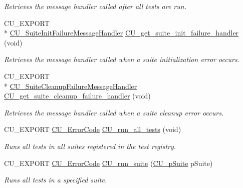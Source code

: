 \begin{DoxyCompactItemize}
\begin{DoxyCompactList}\small\item\em Retrieves the message handler called after all tests are run. \end{DoxyCompactList}\item 
C\-U\-\_\-\-E\-X\-P\-O\-R\-T \\*
\hyperlink{group__Framework_ga53faf49a6045a1fc32c5a0287b800b65}{C\-U\-\_\-\-Suite\-Init\-Failure\-Message\-Handler} \hyperlink{group__Framework_ga9b9f86b2d875553995daf07baea7db3b}{C\-U\-\_\-get\-\_\-suite\-\_\-init\-\_\-failure\-\_\-handler} (void)
\begin{DoxyCompactList}\small\item\em Retrieves the message handler called when a suite initialization error occurs. \end{DoxyCompactList}\item 
C\-U\-\_\-\-E\-X\-P\-O\-R\-T \\*
\hyperlink{group__Framework_ga67a720062975e6b7f97df16a1e8e10ce}{C\-U\-\_\-\-Suite\-Cleanup\-Failure\-Message\-Handler} \hyperlink{group__Framework_ga9d180e4db3591109077c81c6ab4cb151}{C\-U\-\_\-get\-\_\-suite\-\_\-cleanup\-\_\-failure\-\_\-handler} (void)
\begin{DoxyCompactList}\small\item\em Retrieves the message handler called when a suite cleanup error occurs. \end{DoxyCompactList}\item 
C\-U\-\_\-\-E\-X\-P\-O\-R\-T \hyperlink{group__Framework_ga743a2a025ee3eb792d7d85f0eea347e6}{C\-U\-\_\-\-Error\-Code} \hyperlink{group__Framework_gada41915e7f9ae386ecc1bed20a79300b}{C\-U\-\_\-run\-\_\-all\-\_\-tests} (void)
\begin{DoxyCompactList}\small\item\em Runs all tests in all suites registered in the test registry. \end{DoxyCompactList}\item 
C\-U\-\_\-\-E\-X\-P\-O\-R\-T \hyperlink{group__Framework_ga743a2a025ee3eb792d7d85f0eea347e6}{C\-U\-\_\-\-Error\-Code} \hyperlink{group__Framework_ga765ad6b90ec25090288ec10d34fc15c0}{C\-U\-\_\-run\-\_\-suite} (\hyperlink{group__Framework_gaba832ae8b235f5e70d6a4ac9c3bb1219}{C\-U\-\_\-p\-Suite} p\-Suite)
\begin{DoxyCompactList}\small\item\em Runs all tests in a specified suite. \end{DoxyCompactList}\item 

\end{DoxyCompactItemize}
